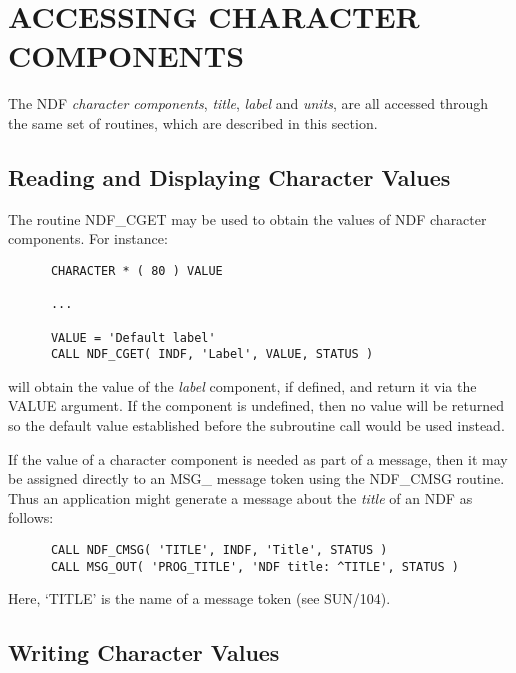 \documentclass[twoside,11pt]{article}
\newcommand{\htmlref}[2]{#1}
\newcommand{\xref}[3]{#1}
\newcommand{\xlabel}[1]{}
\newcommand{\st}[1]{{\em{#1}}}
\begin{document}
\section{\xlabel{accessing_character_components}\label{ss:accessingcharcomponents}ACCESSING CHARACTER COMPONENTS}

The NDF \st{character components}, \st{title}, \st{label\/} and \st{units},
are all accessed through the same set of routines, which are described in this
section.

\subsection{\xlabel{reading_and_displaying_character_values}\label{ss:cmsg}Reading and Displaying Character Values}

The routine \htmlref{NDF\_CGET}{NDF_CGET} may be used to obtain the values of NDF character
components.
For instance:

\small
\begin{verbatim}
      CHARACTER * ( 80 ) VALUE

      ...

      VALUE = 'Default label'
      CALL NDF_CGET( INDF, 'Label', VALUE, STATUS )
\end{verbatim}
\normalsize

will obtain the value of the \st{label\/} component, if defined, and return
it via the VALUE argument. 
If the component is undefined, then no value will be returned so the
default value established before the subroutine call would be used instead. 

If the value of a character component is needed as part of a message,
then it may be assigned directly to an \xref{MSG\_ message
token}{sun104}{msg} using the \htmlref{NDF\_CMSG}{NDF_CMSG} routine.
Thus an application might generate a message about the \st{title\/} of an NDF as
follows: 

\small
\begin{verbatim}
      CALL NDF_CMSG( 'TITLE', INDF, 'Title', STATUS )
      CALL MSG_OUT( 'PROG_TITLE', 'NDF title: ^TITLE', STATUS )
\end{verbatim}
\normalsize

Here, `TITLE' is the name of a message token (see
\xref{SUN/104}{sun104}{}).

\subsection{\xlabel{writing_character_values}Writing Character Values}
\end{document}
